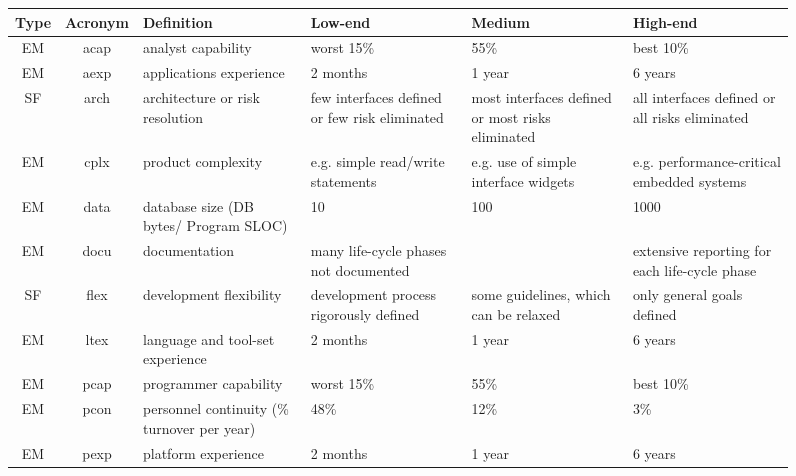 
\begin{figure}
{\footnotesize
\begin{center}
\begin{tabular}{|c|c|p{1.5in}|p{1.2in}|p{1.2in}|p{1.2in}|}\hline
Type &Acronym
 & Definition & Low-end
 &Medium &High-end\\\hline\hline
EM&acap  &  analyst capability  &  worst 15\% &   55\%  &  best 10\% \\\hline




EM&aexp   &   applications experience  &  2 months &   1 year  &  6 years\\\hline

SF&arch &  architecture or risk resolution  &  few interfaces
defined or few risk eliminated  &  most interfaces defined or most
risks eliminated   & all interfaces defined or all risks
eliminated\\\hline



EM&cplx   &   product complexity   & e.g. simple read/write
statements & e.g. use of simple interface widgets  &  e.g.
performance-critical embedded systems\\\hline


EM&data   &   database size \newline
(DB bytes/ Program SLOC) &
10 & 100 &    1000 \\\hline

EM&docu   &   documentation   & many life-cycle phases not
documented      & &  extensive reporting for each life-cycle phase\\\hline

SF&flex   &   development flexibility   & development process
rigorously defined & some guidelines, which can be relaxed & only
general goals defined\\\hline

EM&ltex   &  language and tool-set experience   & 2 months  &  1
year & 6 years \\\hline

EM&pcap   &   programmer capability  &  worst 15\%   & 55\%  &  best 10\% \\\hline



EM&pcon   &   personnel continuity \newline
(\% turnover per year) &
    48\% &    12\%  & 3\% \\\hline

EM&pexp   &  platform experience  &  2 months  &  1 year  &  6 years\\\hline



\end{tabular}
\end{center}}
\end{figure}
